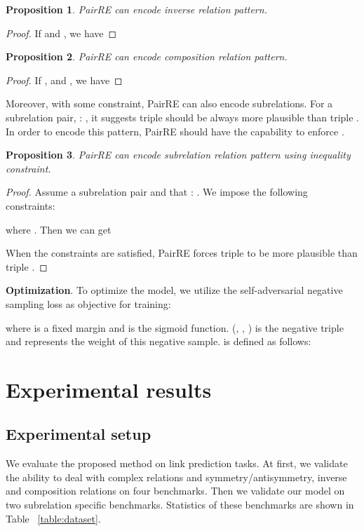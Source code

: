 \documentclass[11pt,a4paper]{article}
\newtheorem{proposition}{Proposition}
\begin{document}
\begin{proposition}
PairRE can encode inverse relation pattern.
\end{proposition}

\begin{proof}
If  and , we have

\end{proof}

\begin{proposition}
PairRE can encode composition relation pattern.
\end{proposition}

\begin{proof}
If ,  and , we have

\end{proof}

Moreover, with some constraint, PairRE can also encode subrelations. For a subrelation pair,  : , it suggests triple  should be always more plausible than triple . 
In order to encode this pattern, PairRE should have the capability to enforce .

\begin{proposition}
PairRE can encode subrelation relation pattern using inequality constraint.
\end{proposition}

\begin{proof}
Assume a subrelation pair  and  that : .
We impose the following constraints:

where . Then we can get

When the constraints are satisfied, PairRE forces triple  to be more plausible than triple .
\end{proof}

\textbf{Optimization}. To optimize the model, we utilize the self-adversarial negative sampling loss \cite{sun2019rotate} as objective for training:

where  is a fixed margin and  is the sigmoid function.
(, , ) is the  negative
triple and  represents the weight of this negative
sample.  is defined as
follows:


\section{Experimental results}
\subsection{Experimental setup}
We evaluate the proposed method on link prediction tasks.
At first, we validate the ability to deal with complex relations and symmetry/antisymmetry, inverse and composition relations on four benchmarks.
Then we validate our model on two subrelation specific benchmarks. Statistics of these benchmarks are shown in Table ~\ref{table:dataset}.
\end{document}
